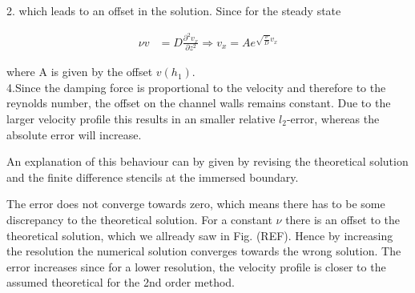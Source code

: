 2.
which leads to an offset in the solution.
Since for the steady state

\begin{align}
 \nu v &= D \frac{\partial^2 v_x}{\partial z^2}  \Rightarrow  v_x = A e^{\sqrt{\frac{\nu}{D}}v_x}
\end{align}

where A is given by the offset $v(h_1)$.\\


4.Since the damping force is proportional to the velocity and therefore to the reynolds number, the offset on the channel walls remains constant.
Due to the larger velocity profile this results in an smaller relative $l_2$-error, whereas the absolute error will increase.

An explanation of this behaviour can by given by revising the theoretical solution and the finite difference stencils at the immersed boundary.

The error does not converge towards zero, which means there has to be some discrepancy to the theoretical solution.
For a constant $\nu$ there is an offset to the theoretical solution, which we allready saw in Fig. (REF).
Hence by increasing the resolution the numerical solution converges towards the wrong solution.
The error increases since for a lower resolution, the velocity profile is closer to the assumed theoretical for the 2nd order method.

